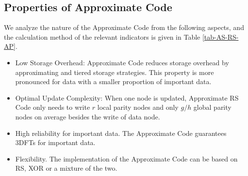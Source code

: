 \documentclass[sigconf]{acmart}
\begin{document}
\subsection{Properties of Approximate Code}\label{properties}

We analyze the nature of the Approximate Code from the following aspects, and the calculation method of the relevant indicators is given in Table \ref{tab-AS-RS-AP}.
\begin{itemize}
    \item Low Storage Overhead: Approximate Code reduces storage overhead by approximating and tiered storage strategies. This property is more pronounced for data with a smaller proportion of important data.
    \item Optimal Update Complexity: When one node is updated, Approximate RS Code only needs to write $r$ local parity nodes and only $g/h$ global parity nodes on average besides the write of data node.
    \item High reliability for important data. The Approximate Code guarantees 3DFTs for important data.
    \item Flexibility. The implementation of the Approximate Code can be based on RS, XOR or a mixture of the two.
\end{itemize}
\end{document}
